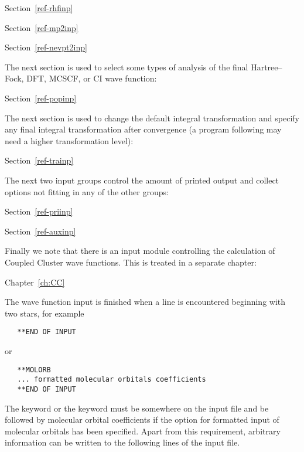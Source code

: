 Section~\ref{ref-rhfinp} 

Section~\ref{ref-mp2inp} 

Section~\ref{ref-nevpt2inp} 

\noindent
The next section is used to select some types of analysis of the final
Hartree--Fock, DFT, MCSCF, or CI wave function:

Section~\ref{ref-popinp} 

\noindent
The next section is used to change the default integral transformation
and specify any final integral transformation after convergence (a
program following {\sir} may need a higher transformation level):

Section~\ref{ref-trainp} 

\noindent
The next two input groups control the amount of printed output and
collect options not fitting in any of the other groups:

Section~\ref{ref-priinp} 

Section~\ref{ref-auxinp} 

\noindent
Finally we note that there is an input module controlling the
calculation of Coupled Cluster wave functions. This is treated in a
separate chapter:

Chapter~\ref{ch:CC} 

\bigskip
\noindent
The wave function input is finished when a line is encountered beginning
with two stars, for example

\begin{inputex} \begin{verbatim}
   **END OF INPUT
\end{verbatim} \end{inputex}
or

\begin{inputex} \begin{verbatim}
   **MOLORB
   ... formatted molecular orbitals coefficients
   **END OF INPUT
\end{verbatim} \end{inputex}

\noindent
The  keyword or the  keyword
must be somewhere on the input file and be
followed by molecular orbital coefficients if the option for formatted
input of molecular orbitals has been specified.  Apart from this
requirement, arbitrary information can be written to the following lines
of the input file.



